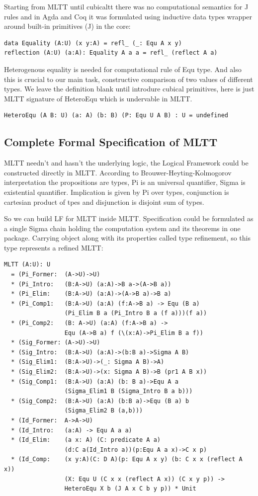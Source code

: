 \documentclass{svproc}
\begin{document}
Starting from MLTT until cubicaltt there was no computational semantics
for J rules and in Agda and Coq it was formulated using inductive data types
wrapper around built-in primitives (J) in the core:

\begin{lstlisting}[mathescape=true]
data Equality (A:U) (x y:A) = refl_ (_: Equ A x y)
reflection (A:U) (a:A): Equality A a a = refl_ (reflect A a)
\end{lstlisting}

Heterogenous equality is needed for computational rule of Equ type.
And also this is crucial to our main task, constructive
comparison of two values of different types. We leave the definition blank
until introdure cubical primitives, here is just MLTT signature of HeteroEqu
which is undervable in MLTT.

\begin{lstlisting}[mathescape=true]
HeteroEqu (A B: U) (a: A) (b: B) (P: Equ U A B) : U = undefined
\end{lstlisting}

\newpage
\subsection{Complete Formal Specification of MLTT}

MLTT needn't and hasn't the underlying logic, the Logical Framework could be constructed directly in MLTT.
According to Brouwer-Heyting-Kolmogorov interpretation the propositions are types,
Pi is an universal quantifier, Sigma is existential quantifier.
Implication is given by Pi over types, conjunction is cartesian
product of tpes and disjunction is disjoint sum of types.

So we can build LF for MLTT inside MLTT. Specification could be formulated as a
single Sigma chain holding the computation system and its theorems in one package.
Carrying object along with its properties called type refinement, so this type
represents a refined MLTT:

\begin{lstlisting}[mathescape=true]
MLTT (A:U): U
  = (Pi_Former:  (A->U)->U)
  * (Pi_Intro:   (B:A->U) (a:A)->B a->(A->B a))
  * (Pi_Elim:    (B:A->U) (a:A)->(A->B a)->B a)
  * (Pi_Comp1:   (B:A->U) (a:A) (f:A->B a) -> Equ (B a)
                 (Pi_Elim B a (Pi_Intro B a (f a)))(f a))
  * (Pi_Comp2:   (B: A->U) (a:A) (f:A->B a) ->
                 Equ (A->B a) f (\(x:A)->Pi_Elim B a f))
  * (Sig_Former: (A->U)->U)
  * (Sig_Intro:  (B:A->U) (a:A)->(b:B a)->Sigma A B)
  * (Sig_Elim1:  (B:A->U)->(_: Sigma A B)->A)
  * (Sig_Elim2:  (B:A->U)->(x: Sigma A B)->B (pr1 A B x))
  * (Sig_Comp1:  (B:A->U) (a:A) (b: B a)->Equ A a
                 (Sigma_Elim1 B (Sigma_Intro B a b)))
  * (Sig_Comp2:  (B:A->U) (a:A) (b:B a)->Equ (B a) b
                 (Sigma_Elim2 B (a,b)))
  * (Id_Former:  A->A->U)
  * (Id_Intro:   (a:A) -> Equ A a a)
  * (Id_Elim:    (a x: A) (C: predicate A a)
                 (d:C a(Id_Intro a))(p:Equ A a x)->C x p)
  * (Id_Comp:    (x y:A)(C: D A)(p: Equ A x y) (b: C x x (reflect A x))
                 (X: Equ U (C x x (reflect A x)) (C x y p)) ->
                 HeteroEqu X b (J A x C b y p)) * Unit
\end{lstlisting}
\end{document}
